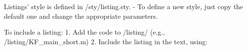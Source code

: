 Listings' style is defined in /sty/listing.sty.
- To define a new style, just copy the default one and change the appropriate parameters.

To include a listing:
1. Add the code to /listing/ (e.g., /listing/KF_main_short.m)
2. Include the listing in the text, using:
%
%


